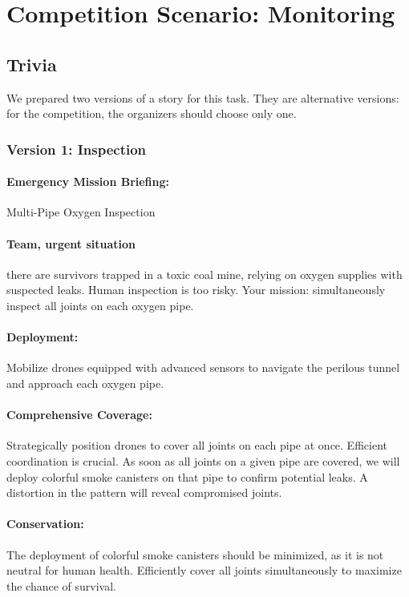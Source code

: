 \section{Competition Scenario: Monitoring}

\subsection{Trivia}
We prepared two versions of a story for this task. They are alternative versions: for the competition, the organizers should choose only one.

\subsubsection{Version 1: Inspection}

\paragraph{Emergency Mission Briefing:} Multi-Pipe Oxygen Inspection

\paragraph{Team, urgent situation} there are survivors trapped in a toxic coal mine, relying on oxygen supplies with suspected leaks. Human inspection is too risky. Your mission: simultaneously inspect all joints on each oxygen pipe.

\paragraph{Deployment:} Mobilize drones equipped with advanced sensors to navigate the perilous tunnel and approach each oxygen pipe.

\paragraph{Comprehensive Coverage:} Strategically position drones to cover all joints on each pipe at once. Efficient coordination is crucial. As soon as all joints on a given pipe are covered, we will deploy colorful smoke canisters on that pipe to confirm potential leaks. A distortion in the pattern will reveal compromised joints.

\paragraph{Conservation:} The deployment of colorful smoke canisters should be minimized, as it is not neutral for human health. Efficiently cover all joints simultaneously to maximize the chance of survival.

